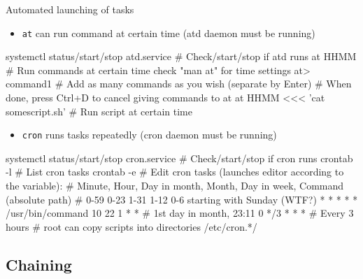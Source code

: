 \documentclass[hyperref={bookmarks=true, unicode=true, colorlinks=true, pdftitle={Linux, command line and MetaCentrum}, plainpages=false, pdfauthor={Vojtech Zeisek}, pdfsubject={Course about use of Linux command line, writing shell scripts and using MetaCentrum of CESNET}, pdfcreator={XeLaTeX, http://www.xelatex.org/}, pdfkeywords={Linux, GNU, BASH, shell, command line, MetaCentrum}, linkcolor=Sienna, anchorcolor=black, citecolor=green, filecolor=magenta, menucolor=Sienna, urlcolor=cyan, pdftex}, compress, ucs, xelatex, xcolor=svgnames, 11pt]{beamer}
\begin{document}
\begin{frame}[fragile]{Automated launching of tasks}
\begin{itemize}
  \item \texttt{at} can run command at certain time (atd daemon must be running)
\end{itemize}
  \begin{bashcode}
    systemctl status/start/stop atd.service # Check/start/stop if atd runs
    at HHMM # Run commands at certain time check "man at" for time settings
    at> command1 # Add as many commands as you wish (separate by Enter)
    # When done, press Ctrl+D to cancel giving commands to at
    at HHMM <<< 'cat somescript.sh' # Run script at certain time
  \end{bashcode}
\begin{itemize}
  \item \texttt{cron} runs tasks repeatedly (cron daemon must be running)
\end{itemize}
  \begin{bashcode}
    systemctl status/start/stop cron.service # Check/start/stop if cron runs
    crontab -l # List cron tasks
    crontab -e # Edit cron tasks (launches editor according to the variable):
    # Minute, Hour, Day in month, Month, Day in week, Command (absolute path)
    # 0-59    0-23  1-31          1-12   0-6 starting with Sunday (WTF?)
      *       *     *             *      *            /usr/bin/command
      10      22    1             *      *        # 1st day in month, 23:11
      0       */3   *             *      *        # Every 3 hours
    # root can copy scripts into directories /etc/cron.*/
  \end{bashcode}
\end{frame}

\subsection{Chaining}
\end{document}
